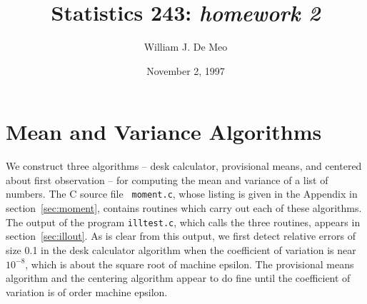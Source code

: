 \documentclass{article}
\begin{document}
\title{Statistics 243: \emph{homework 2}}
\author{William J. De Meo}
\date{November 2, 1997}
\maketitle

\section{Mean and Variance Algorithms}
We construct three algorithms -- desk calculator, provisional
means, and centered about first observation -- for computing the 
mean and variance of a list of numbers.  The C source file {\tt
  moment.c}, whose listing is given in the Appendix in
section~\ref{sec:moment}, contains routines which carry out each of 
these algorithms.  The output of the program {\tt illtest.c}, which
calls the three routines, appears in section~\ref{sec:illout}.  As 
is clear from this output, we first detect relative
errors of size 0.1 in the desk calculator algorithm when 
the coefficient of variation is near $10^{-8}$, which is about
the square root of machine epsilon.  The provisional means 
algorithm and the centering algorithm appear to do fine until 
the coefficient of variation is of order machine epsilon.
\end{document}
